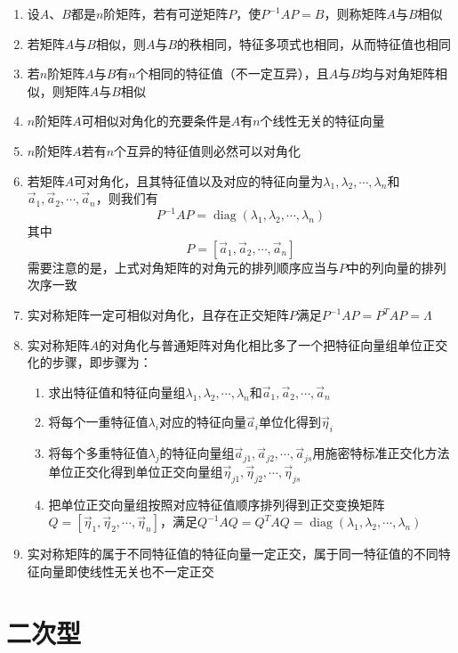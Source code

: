 \documentclass[12pt,a4paper,UTF8]{book}
\begin{document}
\begin{enumerate}
\item 设$A$、$B$都是$n$阶矩阵，若有可逆矩阵$P$，使$P^{-1}AP=B$，则称矩阵$A$与$B$相似
\item 若矩阵$A$与$B$相似，则$A$与$B$的秩相同，特征多项式也相同，从而特征值也相同
\item 若$n$阶矩阵$A$与$B$有$n$个相同的特征值（不一定互异），且$A$与$B$均与对角矩阵相似，则矩阵$A$与$B$相似
\item $n$阶矩阵$A$可相似对角化的充要条件是$A$有$n$个线性无关的特征向量
\item $n$阶矩阵$A$若有$n$个互异的特征值则必然可以对角化
\item 若矩阵$A$可对角化，且其特征值以及对应的特征向量为$\lambda_1,\lambda_2,\cdots,\lambda_n$和$\vec{a}_1,\vec{a}_2,\cdots,\vec{a}_n$，则我们有
\[P^{-1}AP=\operatorname{diag}\left(\lambda_1,\lambda_2,\cdots,\lambda_n\right)\]
其中\[P=\left[\vec{a}_1,\vec{a}_2,\cdots,\vec{a}_n\right]\]
需要注意的是，上式对角矩阵的对角元的排列顺序应当与$P$中的列向量的排列次序一致
\item 实对称矩阵一定可相似对角化，且存在正交矩阵$P$满足$P^{-1}AP=P^TAP=\Lambda$
\item 实对称矩阵$A$的对角化与普通矩阵对角化相比多了一个把特征向量组单位正交化的步骤，即步骤为：
\begin{enumerate}
\item 求出特征值和特征向量组$\lambda_1,\lambda_2,\cdots,\lambda_n$和$\vec{a}_1,\vec{a}_2,\cdots,\vec{a}_n$
\item 将每个一重特征值$\lambda_i$对应的特征向量$\vec{a}_{i}$单位化得到$\vec{\eta}_{i}$
\item 将每个多重特征值$\lambda_j$的特征向量组$\vec{a}_{j1},\vec{a}_{j2},\cdots,\vec{a}_{js}$用施密特标准正交化方法单位正交化得到单位正交向量组$\vec{\eta}_{j1},\vec{\eta}_{j2},\cdots,\vec{\eta}_{js}$
\item 把单位正交向量组按照对应特征值顺序排列得到正交变换矩阵$Q=\left[\vec{\eta}_{1},\vec{\eta}_{2},\cdots,\vec{\eta}_{n}\right]$，满足$Q^{-1}AQ=Q^TAQ=\operatorname{diag}\left(\lambda_1,\lambda_2,\cdots,\lambda_n\right)$
\end{enumerate}
\item 实对称矩阵的属于不同特征值的特征向量一定正交，属于同一特征值的不同特征向量即使线性无关也不一定正交
\end{enumerate}


\section{二次型}
\end{document}

